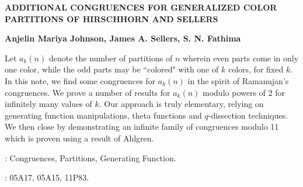 \documentclass[a4paper,12pt,reqno]{amsart}
\numberwithin{equation}{section}
\begin{document}
	\begin{center}{\bf \large
			{ADDITIONAL CONGRUENCES FOR GENERALIZED COLOR PARTITIONS OF HIRSCHHORN AND SELLERS \\[0.15cm] }  }\vspace{0.2cm}
	\end{center}
	
	
	\begin{center}
		\footnotemark[1]
		\bf Anjelin Mariya Johnson, %
	\footnotemark[2]
	\bf James A. Sellers, %
		\footnotemark[3]
		\bf S. N. Fathima  %
		
		
	\end{center}

	\vspace{1 cm}
	\begin{center}
		\begin{minipage}{0.85\textwidth}  %
			
	Let $a_k(n)$ denote the number of partitions of $n$ wherein even parts come in only one color, while the odd parts may be ``colored" with one of $k$ colors, for fixed $k$. In this note, we find some congruences for $a_k(n)$ in the spirit of Ramanujan's congruences. We prove a number of results for $a_k(n)$ modulo powers of $2$ for infinitely many values of $k$. Our approach is truly elementary, relying on generating function manipulations, theta functions and $q$-dissection techniques. We then close by demonstrating an infinite family of congruences modulo 11 which is proven using a result of Ahlgren.
 \\
	\vspace{.125cm}
	
	 : Congruences, Partitions, Generating Function.\\
	\vspace{.05cm}
	
	 : 05A17, 05A15, 11P83.
		\end{minipage}
\end{center}
\end{document}
